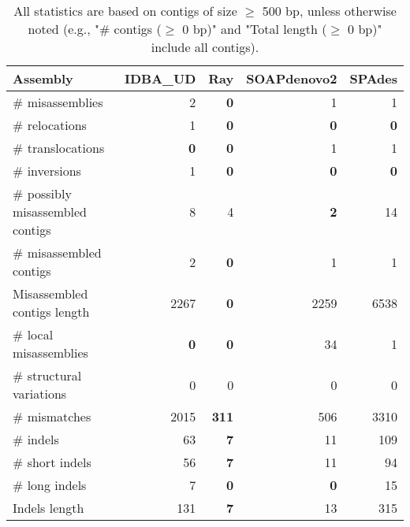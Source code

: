 \documentclass[12pt,a4paper]{article}
\begin{document}
\begin{table}[ht]
\begin{center}
\caption{All statistics are based on contigs of size $\geq$ 500 bp, unless otherwise noted (e.g., "\# contigs ($\geq$ 0 bp)" and "Total length ($\geq$ 0 bp)" include all contigs).}
\begin{tabular}{|l*{4}{|r}|}
\hline
Assembly & IDBA\_UD & Ray & SOAPdenovo2 & SPAdes \\ \hline
\# misassemblies & 2 & {\bf 0} & 1 & 1 \\ \hline
\hspace{5mm}\# relocations & 1 & {\bf 0} & {\bf 0} & {\bf 0} \\ \hline
\hspace{5mm}\# translocations & {\bf 0} & {\bf 0} & 1 & 1 \\ \hline
\hspace{5mm}\# inversions & 1 & {\bf 0} & {\bf 0} & {\bf 0} \\ \hline
\# possibly misassembled contigs & 8 & 4 & {\bf 2} & 14 \\ \hline
\# misassembled contigs & 2 & {\bf 0} & 1 & 1 \\ \hline
Misassembled contigs length & 2267 & {\bf 0} & 2259 & 6538 \\ \hline
\# local misassemblies & {\bf 0} & {\bf 0} & 34 & 1 \\ \hline
\# structural variations & 0 & 0 & 0 & 0 \\ \hline
\# mismatches & 2015 & {\bf 311} & 506 & 3310 \\ \hline
\# indels & 63 & {\bf 7} & 11 & 109 \\ \hline
\hspace{5mm}\# short indels & 56 & {\bf 7} & 11 & 94 \\ \hline
\hspace{5mm}\# long indels & 7 & {\bf 0} & {\bf 0} & 15 \\ \hline
Indels length & 131 & {\bf 7} & 13 & 315 \\ \hline
\end{tabular}
\end{center}
\end{table}
\end{document}
